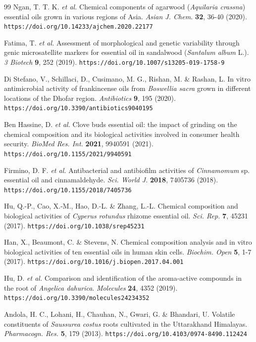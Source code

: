 \documentclass[11pt]{article}
\begin{document}
\begin{thebibliography}{99}
Ngan, T. T. K. \emph{et al.} Chemical components of agarwood (\emph{Aquilaria crassna}) essential oils grown in various regions of Asia. \emph{Asian J. Chem.} \textbf{32}, 36-40 (2020). \nolinkurl{https://doi.org/10.14233/ajchem.2020.22177}

Fatima, T. \emph{et al.} Assessment of morphological and genetic variability through genic microsatellite markers for essential oil in sandalwood (\emph{Santalum album} L.). \emph{3 Biotech} \textbf{9}, 252 (2019). \nolinkurl{https://doi.org/10.1007/s13205-019-1758-9}

Di Stefano, V., Schillaci, D., Cusimano, M. G., Rishan, M. \& Rashan, L. In vitro antimicrobial activity of frankincense oils from \emph{Boswellia sacra} grown in different locations of the Dhofar region. \emph{Antibiotics} \textbf{9}, 195 (2020). \nolinkurl{https://doi.org/10.3390/antibiotics9040195}

Ben Hassine, D. \emph{et al.} Clove buds essential oil: the impact of grinding on the chemical composition and its biological activities involved in consumer health security. \emph{BioMed Res. Int.} \textbf{2021}, 9940591 (2021). \nolinkurl{https://doi.org/10.1155/2021/9940591}

Firmino, D. F. \emph{et al.} Antibacterial and antibiofilm activities of \emph{Cinnamomum} sp. essential oil and cinnamaldehyde. \emph{Sci. World J.} \textbf{2018}, 7405736 (2018). \nolinkurl{https://doi.org/10.1155/2018/7405736}

Hu, Q.-P., Cao, X.-M., Hao, D.-L. \& Zhang, L.-L. Chemical composition and biological activities of \emph{Cyperus rotundus} rhizome essential oil. \emph{Sci. Rep.} \textbf{7}, 45231 (2017). \nolinkurl{https://doi.org/10.1038/srep45231}

Han, X., Beaumont, C. \& Stevens, N. Chemical composition analysis and in vitro biological activities of ten essential oils in human skin cells. \emph{Biochim. Open} \textbf{5}, 1-7 (2017). \nolinkurl{https://doi.org/10.1016/j.biopen.2017.04.001}

Hu, D. \emph{et al.} Comparison and identification of the aroma-active compounds in the root of \emph{Angelica dahurica}. \emph{Molecules} \textbf{24}, 4352 (2019). \nolinkurl{https://doi.org/10.3390/molecules24234352}

Andola, H. C., Lohani, H., Chauhan, N., Gwari, G. \& Bhandari, U. Volatile constituents of \emph{Saussurea costus} roots cultivated in the Uttarakhand Himalayas. \emph{Pharmacogn. Res.} \textbf{5}, 179 (2013). \nolinkurl{https://doi.org/10.4103/0974-8490.112424}


\end{thebibliography}
\end{document}
